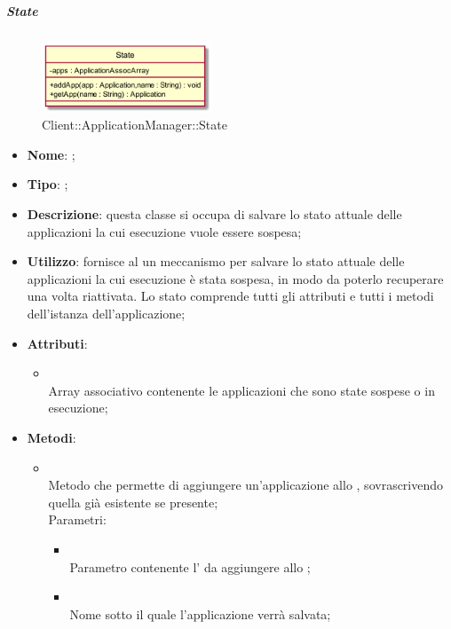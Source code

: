 \hypertarget{State_label}{\subparagraph{State}}
\begin{figure}[h]
	\centering
	\includegraphics[width=0.45\textwidth,height=\textheight,keepaspectratio]{images/ClassState.png}
	\caption{Client::ApplicationManager::State}
\end{figure}
\begin{itemize}
	\item \textbf{Nome}: ;
	\item \textbf{Tipo}: ;
	\item \textbf{Descrizione}: questa classe si occupa di salvare lo stato attuale delle applicazioni la cui esecuzione vuole essere sospesa;
	\item \textbf{Utilizzo}: fornisce al  un meccanismo per salvare lo stato attuale delle applicazioni la cui esecuzione è stata sospesa, in modo da poterlo recuperare una volta riattivata. Lo stato comprende tutti gli attributi e tutti i metodi dell'istanza dell'applicazione;
	\item \textbf{Attributi}:
	\begin{itemize}
		\item[]  \\
		Array associativo contenente le applicazioni che sono state sospese o in esecuzione;
	\end{itemize}
	\item \textbf{Metodi}:
	\begin{itemize}
		\item[]  \\		Metodo che permette di aggiungere un'applicazione allo , sovrascrivendo quella già esistente se presente;\\
		Parametri:
		\begin{itemize}
			\item {} \\
			Parametro contenente l' da aggiungere allo ;
			\item {} \\
			Nome sotto il quale l'applicazione verrà salvata;
		\end{itemize}

\end{itemize}
\end{itemize}
